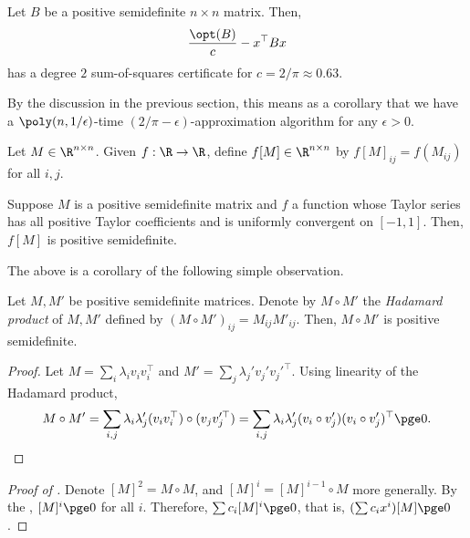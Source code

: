	\begin{ftheo}[Nesterov]
		\label{thm: nesterov}
		Let $B$ be a positive semidefinite $n\times n$ matrix. Then,
		\[ \frac{\opt(B)}{c} - x^\top B x \]
		has a degree $2$ sum-of-squares certificate for $c = 2/\pi \approx 0.63$.
	\end{ftheo}
	By the discussion in the previous section, this means as a corollary that we have a $\poly(n,1/\epsilon)$-time $(2/\pi-\epsilon)$-approximation algorithm for any $\epsilon > 0$.

	\begin{definition}
		Let $M \in \R^{n \times n}$. Given $f : \R \to \R$, define $f[M] \in \R^{n \times n}$ by $f[M]_{ij} = f(M_{ij})$ for all $i,j$.
	\end{definition}

	\begin{fprop}
		\label{prop: taylor-fM-psd}
		Suppose $M$ is a positive semidefinite matrix and $f$ a function whose Taylor series has all positive Taylor coefficients and is uniformly convergent on $[-1,1]$. Then, $f[M]$ is positive semidefinite.
	\end{fprop}

	The above is a corollary of the following simple observation.

	\begin{prop}
		\label{schur-prod-thm}
		Let $M,M'$ be positive semidefinite matrices. Denote by $M \circ M'$ the \emph{Hadamard product} of $M,M'$ defined by $(M\circ M')_{ij} = M_{ij} M'_{ij}$. Then, $M \circ M'$ is positive semidefinite.
	\end{prop}
	\begin{proof}
		Let $M = \sum_i \lambda_i v_i v_i^\top$ and $M' = \sum_j \lambda_j' v_j'v_j'^\top$. Using linearity of the Hadamard product,
		\[ M \circ M' = \sum_{i,j} \lambda_i \lambda'_j (v_i v_i^\top) \circ (v_j v_j'^\top) = \sum_{i,j} \lambda_i \lambda'_j (v_i \circ v_j') (v_i \circ v_j')^\top \pge 0. \qedhere \]
	\end{proof}

	\begin{proof}[Proof of ]
		Denote $[M]^2 = M \circ M$, and $[M]^i = [M]^{i-1} \circ M$ more generally. By the , $[M]^i \pge 0$ for all $i$. Therefore, $\sum c_i [M]^i \pge 0$, that is, $(\sum c_i x^i)[M] \pge 0$.
	\end{proof}


